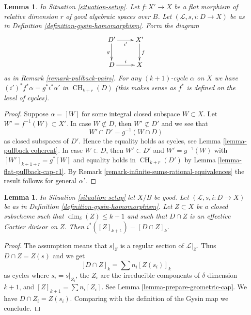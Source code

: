 \documentclass{stacks-project}
\theoremstyle{plain}
\newtheorem{lemma}[subsection]{Lemma}
\theoremstyle{definition}
\theoremstyle{remark}
\numberwithin{equation}{subsection}
\def\CH{\mathop{\mathrm{CH}}\nolimits}
\begin{document}
\begin{lemma}
\label{lemma-gysin-flat-pullback}
In Situation \ref{situation-setup}. Let $f : X' \to X$
be a flat morphism of relative dimension $r$ of
good algebraic spaces over $B$. Let $(\mathcal{L}, s, i : D \to X)$ be as in
Definition \ref{definition-gysin-homomorphism}. Form the diagram
$$
\xymatrix{
D' \ar[d]_g \ar[r]_{i'} & X' \ar[d]^f \\
D \ar[r]^i & X
}
$$
as in Remark \ref{remark-pullback-pairs}.
For any $(k + 1)$-cycle $\alpha$ on $X$ we have
$(i')^*f^*\alpha = g^*i^*\alpha'$ in $\CH_{k + r}(D)$
(this makes sense as $f^*$ is defined on the level of cycles).
\end{lemma}

\begin{proof}
Suppose $\alpha = [W]$ for some integral closed subspace
$W \subset X$. Let $W' = f^{-1}(W) \subset X'$. In case $W \not \subset D$,
then $W' \not \subset D'$ and we see that
$$
W' \cap D' = g^{-1}(W \cap D)
$$
as closed subspaces of $D'$. Hence the
equality holds as cycles, see Lemma \ref{lemma-pullback-coherent}.
In case $W \subset D$, then $W' \subset D'$ and $W' = g^{-1}(W)$
with $[W']_{k + 1 + r} = g^*[W]$ and equality holds in
$\CH_{k + r}(D')$ by Lemma \ref{lemma-flat-pullback-cap-c1}.
By Remark \ref{remark-infinite-sums-rational-equivalences}
the result follows for general $\alpha'$.
\end{proof}

\begin{lemma}
\label{lemma-easy-gysin}
In Situation \ref{situation-setup} let $X/B$ be good.
Let $(\mathcal{L}, s, i : D \to X)$ be as in
Definition \ref{definition-gysin-homomorphism}.
Let $Z \subset X$ be a closed subscheme such
that $\dim_\delta(Z) \leq k + 1$ and such that
$D \cap Z$ is an effective Cartier divisor on $Z$. Then
$i^*([Z]_{k + 1}) = [D \cap Z]_k$.
\end{lemma}

\begin{proof}
The assumption means that $s|_Z$ is a regular section of $\mathcal{L}|_Z$.
Thus $D \cap Z = Z(s)$ and we get
$$
[D \cap Z]_k = \sum n_i [Z(s_i)]_k
$$
as cycles where $s_i = s|_{Z_i}$, the $Z_i$ are the irreducible components
of $\delta$-dimension $k + 1$, and $[Z]_{k + 1} = \sum n_i[Z_i]$.
See Lemma \ref{lemma-prepare-geometric-cap}.
We have $D \cap Z_i = Z(s_i)$. Comparing with the definition
of the Gysin map we conclude.
\end{proof}
\end{document}
